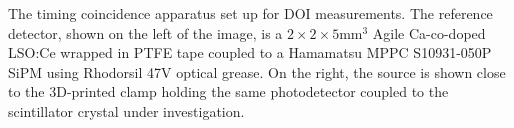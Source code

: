 \label{fig:actualsetup} The timing coincidence apparatus set up for DOI measurements. The reference detector, shown on the left of the image, is a $2\times2\times5$mm$^3$ Agile Ca-co-doped LSO:Ce wrapped in PTFE tape coupled to a Hamamatsu MPPC S10931-050P SiPM using Rhodorsil 47V optical grease. On the right, the source is shown close to the 3D-printed clamp holding the same photodetector coupled to the scintillator crystal under investigation.